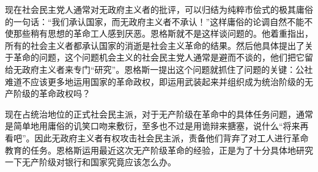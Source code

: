 现在社会民主党人通常对无政府主义者的批评，可以归结为纯粹市侩式的极其庸俗的一句话：“我们承认国家，而无政府主义者不承认！”这样庸俗的论调自然不能不使那些稍有思想的革命工人感到厌恶。恩格斯就不是这样谈问题的。他着重指出，所有的社会主义者都承认国家的消逝是社会主义革命的结果。然后他具体提出了关于革命的问题，这个问题机会主义的社会民主党人通常是避而不谈的，他们把它留给无政府主义者来专门“研究”。恩格斯一提出这个问题就抓住了问题的关键：公社难道不应该{\kaishu 更多地}运用{\kaishu 国家的革命}政权，即运用武装起来并组织成为统治阶级的无产阶级的{\kaishu 革命}政权吗？

现在占统治地位的正式社会民主派，对于无产阶级在革命中的具体任务问题，通常是简单地用庸俗的讥笑口吻来敷衍，至多也不过是用诡辩来搪塞，说什么“将来再看吧”。因此无政府主义者有权攻击社会民主派，责备他们背弃了对工人进行革命教育的任务。恩格斯运用最近这次无产阶级革命的经验，正是为了十分具体地研究一下无产阶级对银行和国家究竟应该怎么办。
